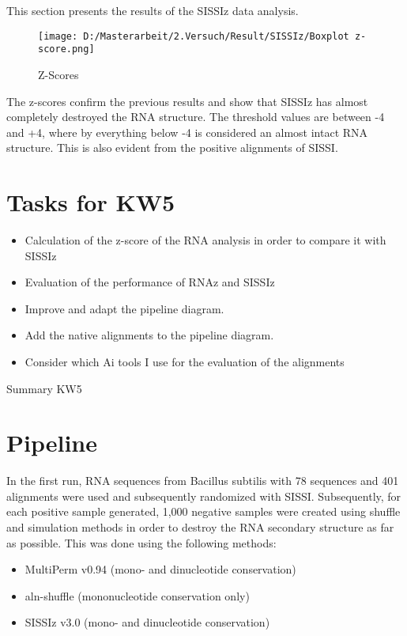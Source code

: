 \documentclass{article}
\begin{document}
\begin{large}
This section presents the results of the SISSIz data analysis.

\begin{figure}[H]
    \centering
    \texttt{[image: D:/Masterarbeit/2.Versuch/Result/SISSIz/Boxplot z-score.png]}
    \caption{Z-Scores}
    \label{fig:sissiz_zscore}
\end{figure}


The z-scores confirm the previous results and show that SISSIz has almost completely destroyed the RNA structure. The threshold values are between -4 and +4, where by everything below -4 is considered an almost intact RNA structure. This is also evident from the positive alignments of SISSI.

\clearpage

\section{Tasks for KW5}

\begin{itemize}
    \item Calculation of the z-score of the RNA analysis in order to compare it with SISSIz
    \item Evaluation of the performance of RNAz and SISSIz
    \item Improve and adapt the pipeline diagram.
    \item Add the native alignments to the pipeline diagram.
    \item Consider which Ai tools I use for the evaluation of the alignments
\end{itemize}

Summary KW5 

\section{Pipeline}

\begin{large}
In the first run, RNA sequences from Bacillus subtilis with 78 sequences and 401 alignments were used and subsequently randomized with SISSI. Subsequently, for each positive sample generated, 1,000 negative samples were created using shuffle and simulation methods in order to destroy the RNA secondary structure as far as possible. This was done using the following methods:

\begin{itemize}
    \item MultiPerm v0.94 (mono- and dinucleotide conservation)
    \item aln-shuffle (mononucleotide conservation only)
    \item SISSIz v3.0 (mono- and dinucleotide conservation)
\end{itemize}


\end{large}
\end{large}
\end{document}
